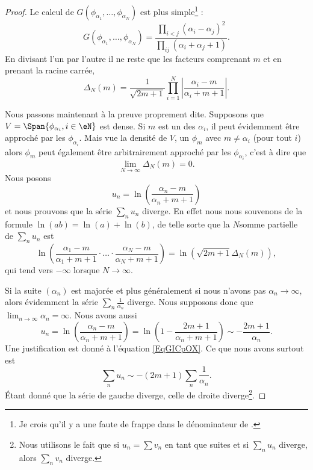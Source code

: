 \begin{proof}
    Le calcul de \( G(\phi_{\alpha_1},\ldots, \phi_{\alpha_N})\) est plus simple\footnote{Je crois qu'il y a une faute de frappe dans le dénominateur de \cite{jqZSyG}.} :
    \begin{equation}
        G(\phi_{\alpha_1},\ldots, \phi_{\alpha_N})=\frac{ \prod_{i<j}(\alpha_i-\alpha_j)^2 }{ \prod_{ij}(\alpha_i+\alpha_j+1) }.    
    \end{equation}
    En divisant l'un par l'autre il ne reste que les facteurs comprenant \( m\) et en prenant la racine carrée,
    \begin{equation}    \label{EqANiuNB}
        \Delta_N(m)=\frac{1}{ \sqrt{2m+1} }\prod_{i=1}^N\left| \frac{ \alpha_i-m }{ \alpha_i+m+1 } \right| .
    \end{equation}
    
    Nous passons maintenant à la preuve proprement dite. Supposons que \( V=\Span\{ \phi_{\alpha_i},i\in \eN \}\) est dense. Si \( m\) est un des \( \alpha_i\), il peut évidemment être approché par les \( \phi_{\alpha_i}\). Mais vue la densité de \( V\), un \( \phi_m\) avec \( m\neq \alpha_i\) (pour tout \( i\)) alors \( \phi_m\) peut également être arbitrairement approché par les \( \phi_{\alpha_i}\), c'est à dire que
    \begin{equation}
        \lim_{N\to \infty} \Delta_N(m)=0.
    \end{equation}
    Nous posons 
    \begin{equation}
        u_n=\ln\left( \frac{ \alpha_n-m }{ \alpha_n+m+1 } \right)
    \end{equation}
    et nous prouvons que la série \( \sum_nu_n\) diverge. En effet nous nous souvenons de la formule \( \ln(ab)=\ln(a)+\ln(b)\), de telle sorte que la \( N\)\ieme somme partielle de \( \sum_nu_n\) est
    \begin{equation}
        \ln\left( \frac{ \alpha_1-m }{ \alpha_1+m+1 }\cdot\ldots\cdot \frac{ \alpha_N-m }{ \alpha_N+m+1 } \right)=\ln\left( \sqrt{2m+1}\Delta_N(m) \right),
    \end{equation}
    qui tend vers \( -\infty\) lorsque \( N\to \infty\).

    Si la suite \( (\alpha_n)\) est majorée et plus généralement si nous n'avons pas \( \alpha_n\to \infty\), alors évidemment la série \( \sum_n\frac{1}{ \alpha_n }\) diverge. Nous supposons donc que \( \lim_{n\to \infty} \alpha_n=\infty\). Nous avons aussi
    \begin{equation}
        u_n=\ln\left( \frac{ \alpha_n-m }{ \alpha_n+m+1 } \right)=\ln\left( 1-\frac{ 2m+1 }{ \alpha_n+m+1 } \right)\sim-\frac{ 2m+1 }{ \alpha_n }.
    \end{equation}
    Une justification est donné à l'équation \eqref{EqGICpOX}. Ce que nous avons surtout est
    \begin{equation}
        \sum_n u_n\sim -(2m+1)\sum_n\frac{1}{ \alpha_n }.
    \end{equation}
    Étant donné que la série de gauche diverge, celle de droite diverge\footnote{Nous utilisons le fait que si \( u_n=\sum v_n\) en tant que suites et si \( \sum_nu_n\) diverge, alors \( \sum_nv_n\) diverge.}.


\end{proof}
